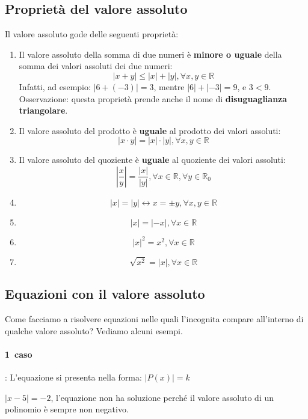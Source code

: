 \subsection{Proprietà del valore assoluto}
Il valore assoluto gode delle seguenti proprietà:
\begin{enumerate}
        \item Il valore assoluto della somma di due numeri è \textbf{minore o 
uguale} della somma dei valori assoluti dei due numeri:
        $$|x+y|\leq |x|+|y|, \forall x,y \in \mathbb{R}$$
        Infatti, ad esempio: $|6+(-3)|=3$, mentre $|6|+|-3|=9$, e $3<9$.\\
        Osservazione: questa proprietà prende anche il nome di 
\textbf{disuguaglianza triangolare}.
        \item Il valore assoluto del  prodotto è \textbf{uguale} al prodotto dei 
valori assoluti:
        $$|x\cdot y|=|x|\cdot |y|, \forall x,y \in \mathbb{R}$$
        \item Il valore assoluto del quoziente è \textbf{uguale} al quoziente 
dei valori assoluti:
        $$\left|\frac{x}{y} \right| =\frac{|x|}{|y|}, \forall x \in \mathbb{R}, 
\forall y \in \mathbb{R}_0$$
        \item $$|x|=|y| \leftrightarrow x=\pm y, \forall x,y \in \mathbb{R}$$
        \item $$|x|=|-x|, \forall x \in \mathbb{R}$$
        \item $$|x|^2=x^2, \forall x \in \mathbb{R}$$
        \item $$\sqrt{x^2}=|x|, \forall x \in \mathbb{R}$$
\end{enumerate}

\subsection{Equazioni con il valore assoluto}
Come facciamo a risolvere equazioni nelle quali l'incognita compare all'interno 
di qualche valore assoluto? Vediamo alcuni esempi.\\
\paragraph{1\textdegree~caso}: L'equazione si presenta nella forma:  $|P(x)|=k$

\begin{esempio} 
$|x-5|=-2$, l'equazione non ha soluzione 
perché il valore assoluto di un polinomio è sempre non negativo.
\end{esempio}

